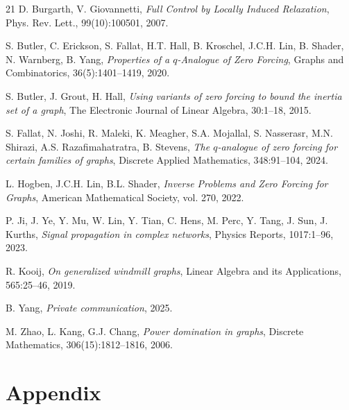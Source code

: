 \documentclass[11pt]{article}
\theoremstyle{plain}
\theoremstyle{definition}
\theoremstyle{remark}
\begin{document}
\begin{thebibliography}{21}
D. Burgarth, V. Giovannetti, 
\textit{Full Control by Locally Induced Relaxation}, 
Phys. Rev. Lett., 99(10):100501, 2007.


S. Butler, C. Erickson, S. Fallat, H.T. Hall, B. Kroschel, J.C.H. Lin, B. Shader, N. Warnberg, B. Yang, 
\textit{Properties of a $q$-Analogue of Zero Forcing}, 
Graphs and Combinatorics, 36(5):1401--1419, 2020.

S. Butler, J. Grout, H. Hall, 
\textit{Using variants of zero forcing to bound the inertia set of a graph}, 
The Electronic Journal of Linear Algebra, 30:1--18, 2015.


S. Fallat, N. Joshi, R. Maleki, K. Meagher, S.A. Mojallal, S. Nasserasr, M.N. Shirazi, A.S. Razafimahatratra, B. Stevens,
\textit{The $q$-analogue of zero forcing for certain families of graphs}, 
Discrete Applied Mathematics, 348:91--104, 2024.

L. Hogben, J.C.H. Lin, B.L. Shader,
\textit{Inverse Problems and Zero Forcing for Graphs}, 
American Mathematical Society, vol. 270, 2022.

P. Ji, J. Ye, Y. Mu, W. Lin, Y. Tian, C. Hens, M. Perc, Y. Tang, J. Sun, J. Kurths,
\textit{Signal propagation in complex networks}, 
Physics Reports, 1017:1--96, 2023.

R. Kooij,
\textit{On generalized windmill graphs}, 
Linear Algebra and its Applications, 565:25--46, 2019.

B. Yang, \textit{Private communication}, 2025.

M. Zhao, L. Kang, G.J. Chang, 
\textit{Power domination in graphs}, 
Discrete Mathematics, 306(15):1812--1816, 2006.

\end{thebibliography}



\newpage
\section{Appendix}


\end{document}
